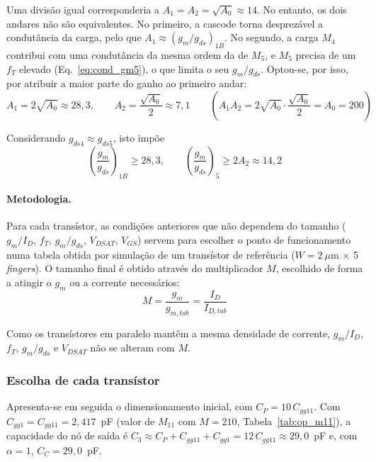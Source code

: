 Uma divisão igual corresponderia a $A_1 = A_2 = \sqrt{A_0} \approx 14$. No entanto, os dois andares não são equivalentes.
No primeiro, a cascode torna desprezável a condutância da carga, pelo que $A_1 \approx (g_m/g_{ds})_{1B}$. No segundo,
a carga $M_4$ contribui com uma condutância da mesma ordem da de $M_5$, e $M_5$ precisa de um $f_T$ elevado (Eq.~\eqref{eq:cond_gm5}),
o que limita o seu $g_m/g_{ds}$. Optou-se, por isso, por atribuir a maior parte do ganho ao primeiro andar:
\begin{equation}
    A_1 = 2\sqrt{A_0} \approx 28{,}3, \qquad A_2 = \frac{\sqrt{A_0}}{2} \approx 7{,}1
    \qquad \left(A_1 A_2 = 2\sqrt{A_0}\cdot\frac{\sqrt{A_0}}{2} = A_0 = 200\right)
\end{equation}

Considerando $g_{ds4} \approx g_{ds5}$, isto impõe
\begin{equation}
    \left(\frac{g_m}{g_{ds}}\right)_{1B} \ge 28{,}3, \qquad
    \left(\frac{g_m}{g_{ds}}\right)_{5} \ge 2A_2 \approx 14{,}2
\end{equation}

\paragraph{Metodologia.} Para cada transístor, as condições anteriores que não dependem do tamanho
($g_m/I_D$, $f_T$, $g_m/g_{ds}$, $V_{DSAT}$, $V_{GS}$) servem para escolher o ponto de funcionamento numa tabela
obtida por simulação de um transístor de referência ($W = 2~\mu$m $\times$ 5 \textit{fingers}).
O tamanho final é obtido através do multiplicador $M$, escolhido de forma a atingir o $g_m$ ou a corrente necessários:
\begin{equation}
    M = \frac{g_m}{g_{m,tab}} = \frac{I_D}{I_{D,tab}}
\end{equation}

Como os transístores em paralelo mantêm a mesma densidade de corrente, $g_m/I_D$, $f_T$, $g_m/g_{ds}$ e $V_{DSAT}$ não se alteram com $M$.

\subsubsection{Escolha de cada transístor}
\label{subsubsec:escolha}

Apresenta-se em seguida o dimensionamento inicial, com $C_P = 10\,C_{gg11}$. Com $C_{gg1} = C_{gg11} = 2{,}417$~pF
(valor de $M_{11}$ com $M = 210$, Tabela~\ref{tab:op_m11}), a capacidade do nó de saída é
$C_3 \approx C_P + C_{gg11} + C_{gg1} = 12\,C_{gg11} \approx 29{,}0$~pF e, com $\alpha = 1$, $C_C = 29{,}0$~pF.

